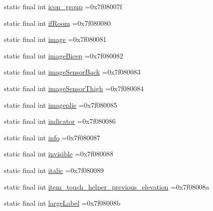 \begin{DoxyCompactItemize}
\item 
static final int \mbox{\hyperlink{classcom_1_1example_1_1trainawearapplication_1_1_r_1_1id_a78be192ba6dea4ce17a713436a4c4401}{icon\+\_\+group}} =0x7f08007f
\item 
static final int \mbox{\hyperlink{classcom_1_1example_1_1trainawearapplication_1_1_r_1_1id_a718a520b853a2b6af5b529386bbc9b0f}{if\+Room}} =0x7f080080
\item 
static final int \mbox{\hyperlink{classcom_1_1example_1_1trainawearapplication_1_1_r_1_1id_ade240531ae1a005175e96abe48ed7fa4}{image}} =0x7f080081
\item 
static final int \mbox{\hyperlink{classcom_1_1example_1_1trainawearapplication_1_1_r_1_1id_ab4af433efced0f4cdea8cfca1e636779}{image\+Bicep}} =0x7f080082
\item 
static final int \mbox{\hyperlink{classcom_1_1example_1_1trainawearapplication_1_1_r_1_1id_a317178de5f2002bb374f9f3dcf7d6b94}{image\+Sensor\+Back}} =0x7f080083
\item 
static final int \mbox{\hyperlink{classcom_1_1example_1_1trainawearapplication_1_1_r_1_1id_a5eb620ecb0298115f46b052e70db437c}{image\+Sensor\+Thigh}} =0x7f080084
\item 
static final int \mbox{\hyperlink{classcom_1_1example_1_1trainawearapplication_1_1_r_1_1id_a27ccba26db1802d03dda9b49a72e55bd}{imageplie}} =0x7f080085
\item 
static final int \mbox{\hyperlink{classcom_1_1example_1_1trainawearapplication_1_1_r_1_1id_a9c61c3e1f6c436ffed5092d24b977536}{indicator}} =0x7f080086
\item 
static final int \mbox{\hyperlink{classcom_1_1example_1_1trainawearapplication_1_1_r_1_1id_a41dfa8afb64beed53b2b8a2d037c317f}{info}} =0x7f080087
\item 
static final int \mbox{\hyperlink{classcom_1_1example_1_1trainawearapplication_1_1_r_1_1id_a2623ef8dc40544674fd54673227374e9}{invisible}} =0x7f080088
\item 
static final int \mbox{\hyperlink{classcom_1_1example_1_1trainawearapplication_1_1_r_1_1id_a636b38f93b74d519c7100458f5b02cca}{italic}} =0x7f080089
\item 
static final int \mbox{\hyperlink{classcom_1_1example_1_1trainawearapplication_1_1_r_1_1id_a7f7883d7dbebf1cabba23f5d7c3add56}{item\+\_\+touch\+\_\+helper\+\_\+previous\+\_\+elevation}} =0x7f08008a
\item 
static final int \mbox{\hyperlink{classcom_1_1example_1_1trainawearapplication_1_1_r_1_1id_a6f27b36ed3dd53214e78e18d9a1a5d5f}{large\+Label}} =0x7f08008b

\end{DoxyCompactItemize}
